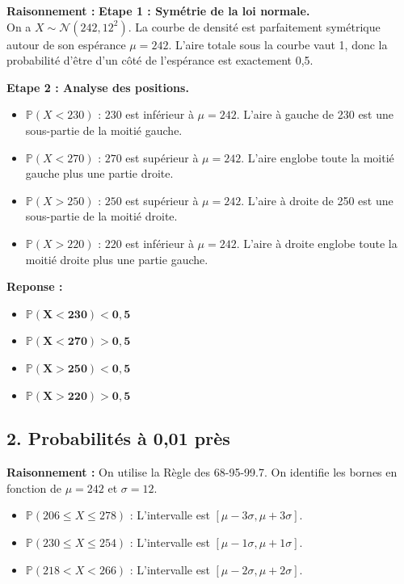 \documentclass[11pt,a4paper]{article}
\begin{document}
\textbf{Raisonnement :}
\textbf{Etape 1 : Symétrie de la loi normale.}\\
On a $X \sim \mathcal{N}(242, 12^2)$. La courbe de densité est parfaitement symétrique autour de son espérance $\mu = 242$. L'aire totale sous la courbe vaut 1, donc la probabilité d'être d'un côté de l'espérance est exactement 0,5.

\textbf{Etape 2 : Analyse des positions.}
\begin{itemize}
    \item $\mathbb{P}(X<230)$ : $230$ est inférieur à $\mu=242$. L'aire à gauche de 230 est une sous-partie de la moitié gauche.
    \item $\mathbb{P}(X<270)$ : $270$ est supérieur à $\mu=242$. L'aire englobe toute la moitié gauche plus une partie droite.
    \item $\mathbb{P}(X>250)$ : $250$ est supérieur à $\mu=242$. L'aire à droite de 250 est une sous-partie de la moitié droite.
    \item $\mathbb{P}(X>220)$ : $220$ est inférieur à $\mu=242$. L'aire à droite englobe toute la moitié droite plus une partie gauche.
\end{itemize}

\textbf{Reponse :}
\begin{itemize}
    \item $\mathbf{\mathbb{P}(X<230) < 0,5}$
    \item $\mathbf{\mathbb{P}(X<270) > 0,5}$
    \item $\mathbf{\mathbb{P}(X>250) < 0,5}$
    \item $\mathbf{\mathbb{P}(X>220) > 0,5}$
\end{itemize}

\subsection*{2. Probabilités à 0,01 près}

\textbf{Raisonnement :} 
On utilise la Règle des 68-95-99.7. On identifie les bornes en fonction de $\mu=242$ et $\sigma=12$.
\begin{itemize}
    \item $\mathbb{P}(206 \le X \le 278)$ : L'intervalle est $[\mu - 3\sigma, \mu + 3\sigma]$.
    \item $\mathbb{P}(230 \le X \le 254)$ : L'intervalle est $[\mu - 1\sigma, \mu + 1\sigma]$.
    \item $\mathbb{P}(218 < X < 266)$ : L'intervalle est $[\mu - 2\sigma, \mu + 2\sigma]$.
\end{itemize}
\end{document}
